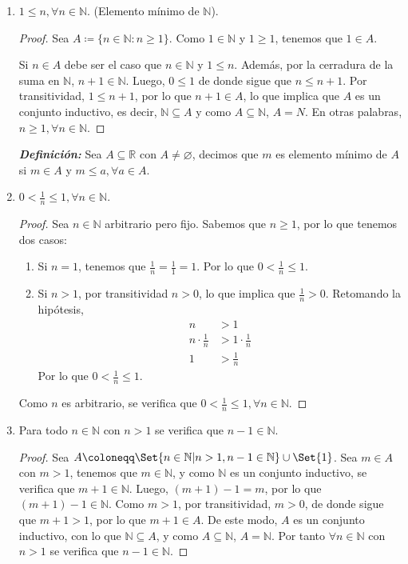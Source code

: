 \documentclass[11pt]{article}
\newcommand{\N}{\mathbb{N}}
\newcommand{\R}{\mathbb{R}}
\newcommand{\bfit}[1]{\textbf{\textit{#1}}}
\let\emptyset\varnothing
\let\set\Set
\let\union\cup
\begin{document}
\begin{enumerate}[label=\alph*)]
    \item $1\leq n, \forall n\in \N$. (Elemento mínimo de $\N$).
    \vspace{-1em}\begin{proof} 
        Sea $A\coloneqq \{n\in \N: n\geq 1\}$. Como $1\in \N$ y $1\geq 1$, tenemos que $1\in A$.

        Si $n\in A$ debe ser el caso que $n\in \N$ y $1\leq n$. Además, por la cerradura de la suma en $\N$, $n+1\in \N$. Luego, $0 \leq 1$ de donde sigue que $n \leq n+1$. Por transitividad, $1\leq n+1$, por lo que $n+1\in A$, lo que implica que $A$ es un conjunto inductivo, es decir, $\N\subseteq A$ y como $A\subseteq \N$, $A=N$. En otras palabras, $n\geq 1, \forall n\in\N$.
    \end{proof} \vspace{-1em}

    \bfit{Definición:}  Sea $A\subseteq \R$ con $A \neq \emptyset$, decimos que $m$ es elemento mínimo de $A$ si $m\in A$ y $m\leq a, \forall a\in A$.

    \item $0<\frac{1}{n}\leq 1, \forall n\in \N$.
    \vspace{-1em}\begin{proof} 
        Sea $n\in \N$ arbitrario pero fijo. Sabemos que $n\geq 1$, por lo que tenemos dos casos: \begin{enumerate}[label=\roman*)]
            \item Si $n=1$, tenemos que $\frac{1}{n}=\frac{1}{1}=1$. Por lo que $0<\frac{1}{n}\leq 1$.
            \item Si $n>1$, por transitividad $n>0$, lo que implica que $\frac{1}{n}>0$. Retomando la hipótesis, \begin{align*}
                n &> 1\\
                n \cdot \frac{1}{n} &> 1\cdot \frac{1}{n}\\
                1 &> \frac{1}{n}
            \end{align*} Por lo que $0<\frac{1}{n}\leq 1$. 
        \end{enumerate} Como $n$ es arbitrario, se verifica que $0<\frac{1}{n}\leq 1, \forall n\in \N$.
    \end{proof} \vspace{-1em}

    \item Para todo $n\in \N$ con $n>1$ se verifica que $n-1\in \N$.
    \vspace{-1em}\begin{proof} 
        Sea $A \coloneqq \set{n\in \N | n>1, n-1\in \N}\union \set{1}$. Sea $m\in A$ con $m>1$, tenemos que $m\in \N$, y como $\N$ es un conjunto inductivo, se verifica que $m+1\in\N$. Luego, $(m+1)-1=m$, por lo que $(m+1)-1\in \N$. Como $m>1$, por transitividad, $m>0$, de donde sigue que $m+1>1$, por lo que $m+1\in A$. De este modo, $A$ es un conjunto inductivo, con lo que $\N \subseteq A$, y como $A\subseteq \N$, $A=\N$. Por tanto $\forall n\in \N$ con $n>1$ se verifica que $n-1\in \N$.
    \end{proof} \vspace{-1em}


\end{enumerate}
\end{document}
